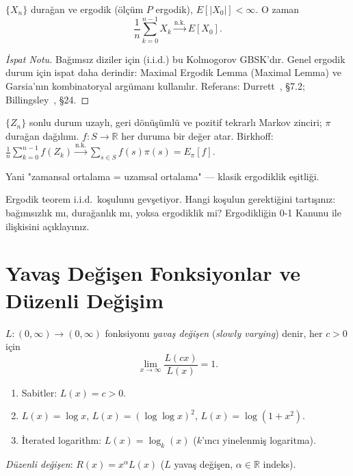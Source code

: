 \begin{teorem}
\label{thm:birkhoff}
$\{X_n\}$ durağan ve ergodik (ölçüm $P$ ergodik), $E[|X_0|] < \infty$. O zaman
\[
  \frac{1}{n}\sum_{k=0}^{n-1} X_k \xrightarrow{\text{n.k.}} E[X_0].
\]
\end{teorem}

\begin{proof}[İspat Notu]
Bağımsız diziler için (i.i.d.) bu Kolmogorov GBSK'dır.
Genel ergodik durum için ispat daha derindir: Maximal Ergodik Lemma (Maximal Lemma)
ve Garsia'nın kombinatoryal argümanı kullanılır.
Referans: Durrett~\cite{Durrett2019}, §7.2; Billingsley~\cite{Billingsley1995}, §24.
\end{proof}

\begin{ornek}
$\{Z_n\}$ sonlu durum uzaylı, geri dönüşümlü ve pozitif tekrarlı Markov zinciri;
$\pi$ durağan dağılımı. $f: S \to \mathbb{R}$ her duruma bir değer atar.
Birkhoff: $\frac{1}{n}\sum_{k=0}^{n-1} f(Z_k) \xrightarrow{\text{n.k.}} \sum_{s\in S} f(s)\pi(s) = E_\pi[f]$.

Yani "zamansal ortalama = uzamsal ortalama" --- klasik ergodiklik eşitliği.
\end{ornek}

\begin{kritiksorgu}
Ergodik teorem i.i.d.\ koşulunu gevşetiyor. Hangi koşulun gerektiğini tartışınız:
bağımsızlık mı, durağanlık mı, yoksa ergodiklik mi? Ergodikliğin 0-1 Kanunu
ile ilişkisini açıklayınız.
\end{kritiksorgu}

\section{Yavaş Değişen Fonksiyonlar ve Düzenli Değişim}
\label{sec:duzenli_degisim}

\begin{tanim}\label{def:yavas_degisen}
$L:(0,\infty)\to(0,\infty)$ fonksiyonu \emph{yavaş değişen} (\emph{slowly varying}) denir, her $c>0$ için
\[
  \lim_{x\to\infty}\frac{L(cx)}{L(x)}=1.
\]
\end{tanim}

\begin{ornek}\label{ex:yavas_ornekler}
\begin{enumerate}
  \item Sabitler: $L(x)=c>0$.
  \item $L(x)=\log x$, $L(x)=(\log\log x)^2$, $L(x)=\log(1+x^2)$.
  \item İterated logarithm: $L(x)=\log_k(x)$ ($k$'ıncı yinelenmiş logaritma).
\end{enumerate}
\emph{Düzenli değişen}: $R(x)=x^\alpha L(x)$ ($L$ yavaş değişen, $\alpha\in\mathbb{R}$ indeks).
\end{ornek}


